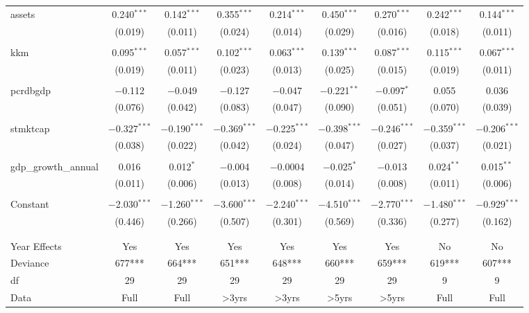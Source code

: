 \documentclass[a4paper,nobind]{templates/ociamthesis}
\begin{document}
\begin{table}[!htbp]
\begin{tabular}{@{\extracolsep{5pt}}lcccccccc}
 assets & 0.240$^{***}$ & 0.142$^{***}$ & 0.355$^{***}$ & 0.214$^{***}$ & 0.450$^{***}$ & 0.270$^{***}$ & 0.242$^{***}$ & 0.144$^{***}$ \\ 
  & (0.019) & (0.011) & (0.024) & (0.014) & (0.029) & (0.016) & (0.018) & (0.011) \\ 
  & & & & & & & & \\ 
 kkm & 0.095$^{***}$ & 0.057$^{***}$ & 0.102$^{***}$ & 0.063$^{***}$ & 0.139$^{***}$ & 0.087$^{***}$ & 0.115$^{***}$ & 0.067$^{***}$ \\ 
  & (0.019) & (0.011) & (0.023) & (0.013) & (0.025) & (0.015) & (0.019) & (0.011) \\ 
  & & & & & & & & \\ 
 pcrdbgdp & $-$0.112 & $-$0.049 & $-$0.127 & $-$0.047 & $-$0.221$^{**}$ & $-$0.097$^{*}$ & 0.055 & 0.036 \\ 
  & (0.076) & (0.042) & (0.083) & (0.047) & (0.090) & (0.051) & (0.070) & (0.039) \\ 
  & & & & & & & & \\ 
 stmktcap & $-$0.327$^{***}$ & $-$0.190$^{***}$ & $-$0.369$^{***}$ & $-$0.225$^{***}$ & $-$0.398$^{***}$ & $-$0.246$^{***}$ & $-$0.359$^{***}$ & $-$0.206$^{***}$ \\ 
  & (0.038) & (0.022) & (0.042) & (0.024) & (0.047) & (0.027) & (0.037) & (0.021) \\ 
  & & & & & & & & \\ 
 gdp\_growth\_annual & 0.016 & 0.012$^{*}$ & $-$0.004 & $-$0.0004 & $-$0.025$^{*}$ & $-$0.013 & 0.024$^{**}$ & 0.015$^{**}$ \\ 
  & (0.011) & (0.006) & (0.013) & (0.008) & (0.014) & (0.008) & (0.011) & (0.006) \\ 
  & & & & & & & & \\ 
 Constant & $-$2.030$^{***}$ & $-$1.260$^{***}$ & $-$3.600$^{***}$ & $-$2.240$^{***}$ & $-$4.510$^{***}$ & $-$2.770$^{***}$ & $-$1.480$^{***}$ & $-$0.929$^{***}$ \\ 
  & (0.446) & (0.266) & (0.507) & (0.301) & (0.569) & (0.336) & (0.277) & (0.162) \\ 
  & & & & & & & & \\ 
\hline \\[-1.8ex] 
Year Effects & Yes & Yes & Yes & Yes & Yes & Yes & No & No \\ 
Deviance & 677*** & 664*** & 651*** & 648*** & 660*** & 659*** & 619*** & 607*** \\ 
df & 29 & 29 & 29 & 29 & 29 & 29 & 9 & 9 \\ 
Data & Full & Full & >3yrs & >3yrs & >5yrs & >5yrs & Full & Full \\ 

\end{tabular}
\end{table}
\end{document}
